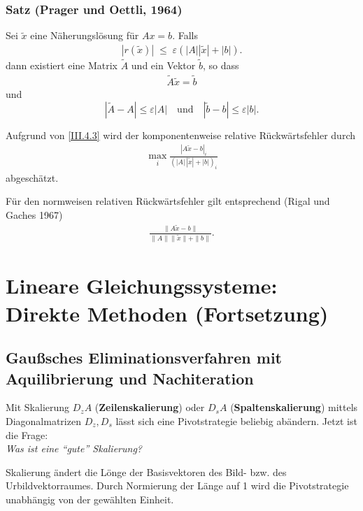 \documentclass[ngerman,fontsize=11pt, paper=a4, parskip=half, titlepage=true, toc=bib]{scrbook}
\newcommand{\sectione}[1]{\section{#1} \setcounter{equation}{0}}
\begin{document}
  \subsection{Satz (Prager und Oettli, 1964)} \label{3.4.1}
  Sei $\tilde{ x}$ eine Näherungslösung für 
  $  A  x =  b$. 
  Falls
  \begin{gather}\label{III.4.3}
    |  r(\tilde { x})|  \; \leq \; \varepsilon ( | A| | \tilde { x} | + |  b|).
  \end{gather}
  dann existiert eine Matrix $\tilde{ A}$  und ein
  Vektor $\tilde { b}$, so dass
  \begin{gather*}
    \tilde{ A} \tilde { x}  =  \tilde{ b} 
  \end{gather*}
  und
  \begin{equation}
    |\tilde{ A} -  A |  \leq  \varepsilon | A|
    \quad \textrm{und} \quad | \tilde{ b} -  b| \leq
    \varepsilon | b|.
    \label{III.4.4}
  \end{equation}
  
  Aufgrund von \eqref{III.4.3} wird der komponentenweise relative
  Rückwärtsfehler durch 
  \begin{gather*}
    \max_i \frac{|  A \tilde{ x} -  b|_i}
    { (| A|\, |\tilde{ x}| + | b|)_i} 
  \end{gather*}
  abgeschätzt.
  
  Für den normweisen relativen Rückwärtsfehler gilt entsprechend
  (Rigal und Gaches 1967)
  \begin{gather*}
    \frac{\|  A \tilde{ x} -  b\|}
    { \| A\| \|\tilde{ x} \| + \| b\| } .
  \end{gather*}
  
  
  \chapter{Lineare Gleichungssysteme: Direkte Methoden (Fortsetzung)}
  
  \sectione{Gaußsches Eliminationsverfahren mit Aquilibrierung und Nachiteration}
  
  Mit Skalierung $D_zA$ (\textbf{Zeilenskalierung}) oder
  $D_sA$ (\textbf{Spaltenskalierung})
  mittels Diagonalmatrizen $D_z, D_s$ lässt sich eine Pivotstrategie beliebig abändern.
  Jetzt ist die Frage: \\
  \textit{Was ist eine \enquote{gute} Skalierung?}
  
  Skalierung ändert die Lönge der Basisvektoren des Bild- bzw. des Urbildvektorraumes.
  Durch Normierung der Länge auf 1 wird die Pivotstrategie unabhängig von der 
  gewählten Einheit.
  
\end{document}
